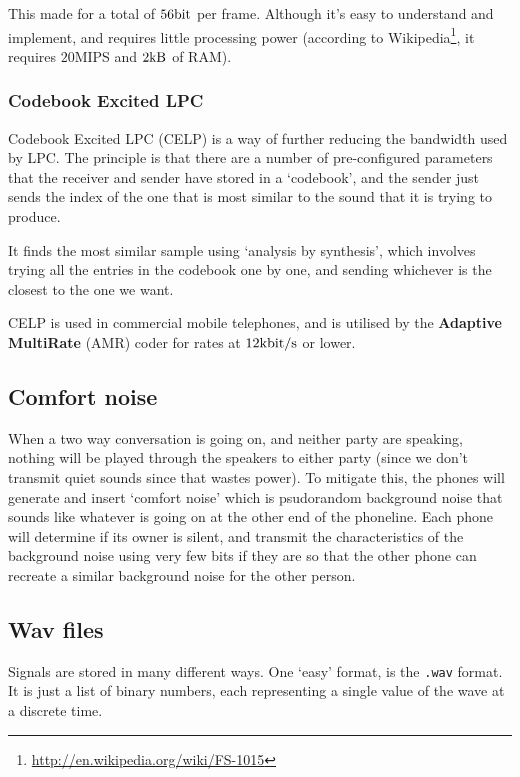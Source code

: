 
This made for a total of $56\si{\bit}$ per frame. Although it's easy to
understand and implement, and requires little processing power (according to
Wikipedia\footnote{\url{http://en.wikipedia.org/wiki/FS-1015}}, it requires
$20$MIPS and $2\si{\kilo\byte}$ of RAM).

\subsubsection{Codebook Excited LPC}

Codebook Excited LPC (CELP) is a way of further reducing the bandwidth used by
LPC. The principle is that there are a number of pre-configured parameters that
the receiver and sender have stored in a `codebook', and the sender just sends
the index of the one that is most similar to the sound that it is trying to
produce.

It finds the most similar sample using `analysis by synthesis', which involves
trying all the entries in the codebook one by one, and sending whichever is the
closest to the one we want. 

CELP is used in commercial mobile telephones, and is utilised by the
\textbf{Adaptive MultiRate} (AMR) coder for rates at
$12\si{\kilo\bit\per\second}$ or lower.

\subsection{Comfort noise}

When a two way conversation is going on, and neither party are speaking, nothing
will be played through the speakers to either party (since we don't transmit
quiet sounds since that wastes power). To mitigate this, the phones will
generate and insert `comfort noise' which is psudorandom background noise that
sounds like whatever is going on at the other end of the phoneline. Each phone
will determine if its owner is silent, and transmit the characteristics of the
background noise using very few bits if they are so that the other phone can
recreate a similar background noise for the other person.

\subsection{Wav files}

Signals are stored in many different ways. One `easy' format, is the
\texttt{.wav} format. It is just a list of binary numbers, each representing a
single value of the wave at a discrete time.

